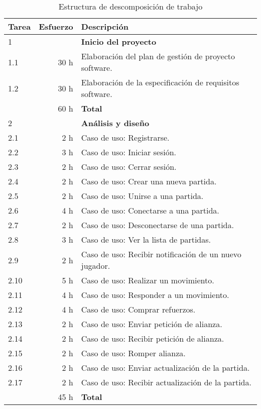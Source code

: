 \begin{longtable}[c]{lrl}
\caption{Estructura de descomposición de trabajo} \\

\textbf{Tarea}&\textbf{Esfuerzo} & \textbf{Descripción} \\
\hline \hline
\endhead

1 & & \textbf{Inicio del proyecto} \\
1.1 & 30 h & Elaboración del plan de gestión de proyecto software. \\
1.2 & 30 h & Elaboración de la especificación de requisitos software. \\
    & 60 h & \textbf{Total} \\
\hline

2 & & \textbf{Análisis y diseño} \\
2.1  & 2 h & Caso de uso: Registrarse. \\
2.2  & 3 h & Caso de uso: Iniciar sesión. \\
2.3  & 2 h & Caso de uso: Cerrar sesión. \\
2.4  & 2 h & Caso de uso: Crear una nueva partida. \\
2.5  & 2 h & Caso de uso: Unirse a una partida. \\
2.6  & 4 h & Caso de uso: Conectarse a una partida. \\
2.7  & 2 h & Caso de uso: Desconectarse de una partida. \\
2.8  & 3 h & Caso de uso: Ver la lista de partidas. \\
2.9  & 2 h & Caso de uso: Recibir notificación de un nuevo jugador. \\
2.10 & 5 h & Caso de uso: Realizar un movimiento. \\
2.11 & 4 h & Caso de uso: Responder a un movimiento. \\
2.12 & 4 h & Caso de uso: Comprar refuerzos. \\
2.13 & 2 h & Caso de uso: Enviar petición de alianza. \\
2.14 & 2 h & Caso de uso: Recibir petición de alianza. \\
2.15 & 2 h & Caso de uso: Romper alianza. \\
2.16 & 2 h & Caso de uso: Enviar actualización de la partida. \\
2.17 & 2 h & Caso de uso: Recibir actualización de la partida. \\
    & 45 h & \textbf{Total} \\
\hline


\end{longtable}
